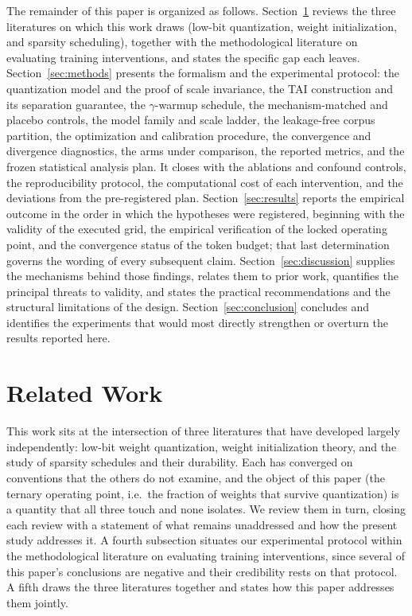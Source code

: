 \documentclass[final,5p,times,twocolumn]{elsarticle}
\theoremstyle{remark}
\begin{document}
The remainder of this paper is organized as follows.
Section~\ref{sec:related} reviews the three literatures on which this work
draws (low-bit quantization, weight initialization, and sparsity
scheduling), together with the methodological literature on evaluating
training interventions, and states the specific gap each leaves.
Section~\ref{sec:methods} presents the formalism and the experimental
protocol: the quantization model and the proof of scale invariance, the TAI
construction and its separation guarantee, the $\gamma$-warmup schedule, the
mechanism-matched and placebo controls, the model family and scale ladder, the
leakage-free corpus partition, the optimization and calibration procedure, the
convergence and divergence diagnostics, the arms under comparison, the
reported metrics, and the frozen statistical analysis plan. It closes with the
ablations and confound controls, the reproducibility protocol, the
computational cost of each intervention, and the deviations from the
pre-registered plan.
Section~\ref{sec:results} reports the empirical outcome in the order in which
the hypotheses were registered, beginning with the validity of the executed
grid, the empirical verification of the locked operating point, and the
convergence status of the token budget; that last determination governs the
wording of every subsequent claim.
Section~\ref{sec:discussion} supplies the mechanisms behind those findings,
relates them to prior work, quantifies the principal threats to validity, and
states the practical recommendations and the structural limitations of the
design.
Section~\ref{sec:conclusion} concludes and identifies the experiments that
would most directly strengthen or overturn the results reported here.



\section{Related Work}
\label{sec:related}

This work sits at the intersection of three literatures that have developed
largely independently: low-bit weight quantization, weight initialization
theory, and the study of sparsity schedules and their durability. Each has
converged on conventions that the others do not examine, and the object of
this paper (the ternary operating point, i.e.\ the fraction of weights
that survive quantization) is a quantity that all three touch and none
isolates. We review them in turn, closing each review with
a statement of what remains unaddressed and how the present study addresses
it. A fourth subsection situates our experimental protocol within the
methodological literature on evaluating training interventions, since several
of this paper's conclusions are negative and their credibility rests on that
protocol. A fifth draws the three literatures together and states how this
paper addresses them jointly.
\end{document}
